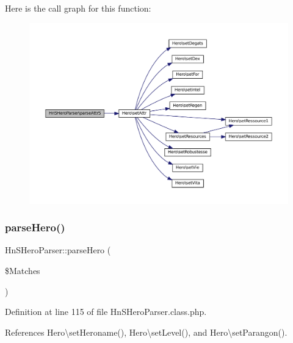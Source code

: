 Here is the call graph for this function\+:\nopagebreak
\begin{figure}[H]
\begin{center}
\leavevmode
\includegraphics[width=350pt]{class_hn_s_hero_parser_a322f6767efcd5b7b71ce8e9792f9e469_cgraph}
\end{center}
\end{figure}
\mbox{\label{class_hn_s_hero_parser_af577e30965cb36431463df160e913ff8}} 
\subsubsection{\texorpdfstring{parse\+Hero()}{parseHero()}}
{\footnotesize\ttfamily Hn\+S\+Hero\+Parser\+::parse\+Hero (\begin{DoxyParamCaption}\item[{}]{\$\+Matches }\end{DoxyParamCaption})\hspace{0.3cm}{\ttfamily [protected]}}



Definition at line 115 of file Hn\+S\+Hero\+Parser.\+class.\+php.



References Hero\textbackslash{}set\+Heroname(), Hero\textbackslash{}set\+Level(), and Hero\textbackslash{}set\+Parangon().

